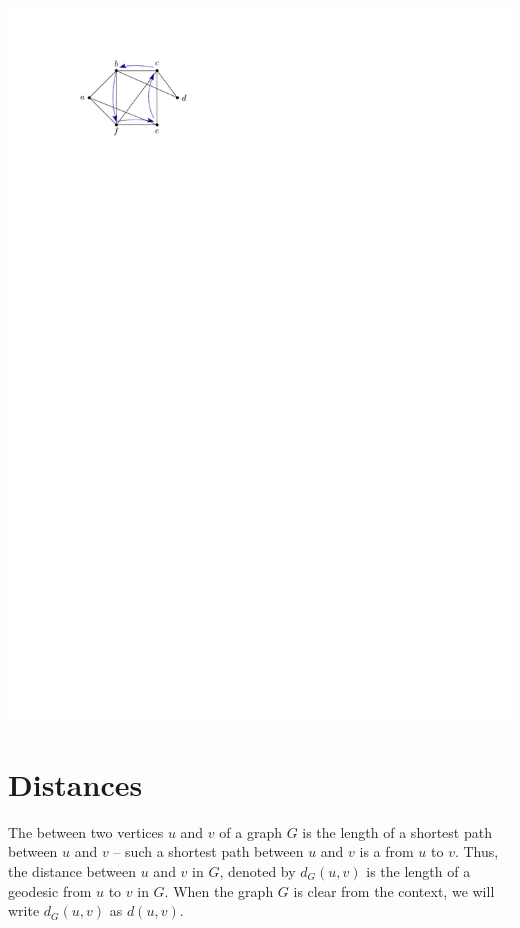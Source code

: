 \begin{Example}
\begin{center}
\includegraphics{Cycle1.pdf}
\end{center}
\end{Example}

\section{Distances}\label{sec:Distances}

The  between two vertices $u$ and $v$ of a graph $G$ is the length of a shortest path between $u$ and $v$ -- such a shortest path between $u$ and $v$ is a  from $u$ to $v$. Thus, the distance between $u$ and $v$ in $G$, denoted by $d_G(u, v)$ is the length of a geodesic from $u$ to $v$ in $G$. When the graph $G$ is clear from the context, we will write $d_G(u, v)$ as $d(u, v)$.

